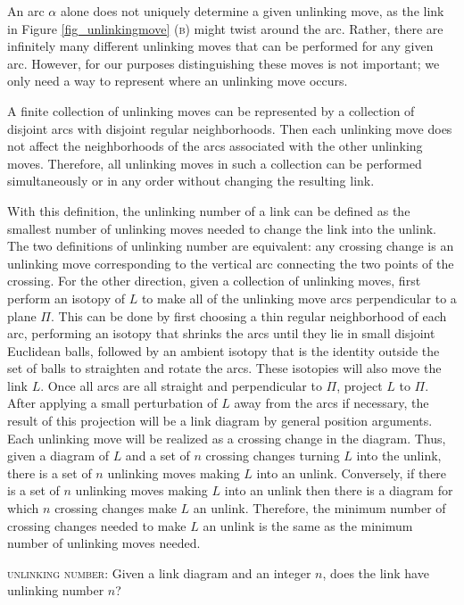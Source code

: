\documentclass[12pt]{amsart}
\theoremstyle{definition}
\theoremstyle{remark}
\begin{document}
An arc $\alpha$ alone does not uniquely determine a given unlinking move, as the link in Figure \ref{fig_unlinkingmove} (\textsc{b}) might twist around the arc.  Rather, there are infinitely many different unlinking moves that can be performed for any given arc.  However, for our purposes distinguishing these moves is not important;  we only need a way to represent where an unlinking move occurs.

A finite collection of unlinking moves can be represented by a collection of disjoint arcs with disjoint regular neighborhoods. Then each unlinking move does not affect the neighborhoods of the arcs associated with the other unlinking moves. Therefore, all unlinking moves in such a collection can be performed simultaneously or in any order without changing the resulting link.


With this definition, the unlinking number of a link can be defined as the smallest number of unlinking moves needed to change the link into the unlink.  The two definitions of unlinking number are equivalent:  any crossing change is an unlinking move corresponding to the vertical arc connecting the two points of the crossing. For the other direction, given a collection of unlinking moves, first perform an isotopy of $L$ to make all of the unlinking move arcs perpendicular to a plane $\Pi$.  This can be done by first choosing a thin regular neighborhood of each arc, performing an isotopy that shrinks the arcs until they lie in small disjoint Euclidean balls, followed by an ambient isotopy that is the identity outside the set of balls to straighten and rotate the arcs.  These isotopies will also move the link $L$.  Once all arcs are all straight and perpendicular to $\Pi$, project $L$ to $\Pi$. After applying a small perturbation of $L$ away from the arcs if necessary, the result of this projection will be a link diagram by general position arguments. Each unlinking move will be realized as a crossing change in the diagram.  Thus, given a diagram of $L$ and a set of $n$ crossing changes turning $L$ into the unlink, there is a set of $n$ unlinking moves making $L$ into an unlink. Conversely, if there is a set of $n$ unlinking moves making $L$ into an unlink then there is a diagram for which $n$ crossing changes make $L$ an unlink.  Therefore, the minimum number of crossing changes needed to make $L$ an unlink is the same as the minimum number of unlinking moves needed.


\vspace{0.14in}
\textsc{unlinking number}: Given a link diagram and an integer $n$, does the link  have unlinking number $n$?
\vspace{0.14in}
\end{document}
